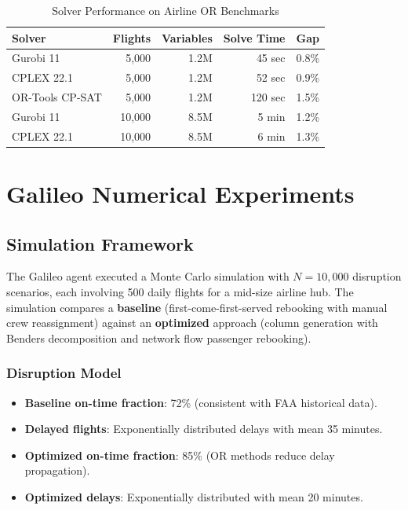 \documentclass[11pt,a4paper]{book}
\theoremstyle{definition}
\begin{document}
\begin{table}[h]
\centering
\caption{Solver Performance on Airline OR Benchmarks}
\label{tab:solvers}
\begin{tabular}{lrrrl}
\toprule
\textbf{Solver} & \textbf{Flights} & \textbf{Variables} & \textbf{Solve Time} & \textbf{Gap} \\
\midrule
Gurobi 11 & 5,000 & 1.2M & 45 sec & 0.8\% \\
CPLEX 22.1 & 5,000 & 1.2M & 52 sec & 0.9\% \\
OR-Tools CP-SAT & 5,000 & 1.2M & 120 sec & 1.5\% \\
Gurobi 11 & 10,000 & 8.5M & 5 min & 1.2\% \\
CPLEX 22.1 & 10,000 & 8.5M & 6 min & 1.3\% \\
\bottomrule
\end{tabular}
\end{table}


\chapter{Galileo Numerical Experiments}

\section{Simulation Framework}

The Galileo agent executed a Monte Carlo simulation with $N = 10{,}000$
disruption scenarios, each involving 500 daily flights for a mid-size
airline hub. The simulation compares a \textbf{baseline} (first-come-first-served
rebooking with manual crew reassignment) against an \textbf{optimized} approach
(column generation with Benders decomposition and network flow passenger rebooking).

\subsection{Disruption Model}

\begin{itemize}
  \item \textbf{Baseline on-time fraction}: 72\% (consistent with FAA historical data).
  \item \textbf{Delayed flights}: Exponentially distributed delays with mean 35 minutes.
  \item \textbf{Optimized on-time fraction}: 85\% (OR methods reduce delay propagation).
  \item \textbf{Optimized delays}: Exponentially distributed with mean 20 minutes.
\end{itemize}
\end{document}
